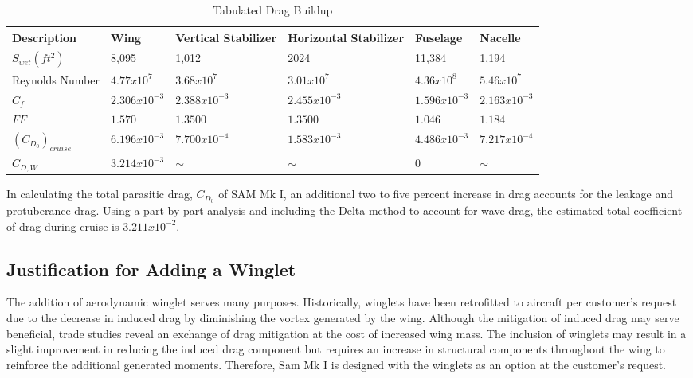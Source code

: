 \begin{table}[!h]
    \centering
    \caption{Tabulated Drag Buildup}
    \begin{tabular}{|p{0.75in}|p{0.75in}|p{0.75in}|p{0.75in}|p{0.75in}|p{0.75in}|}\toprule
        \textbf{Description} & \textbf{Wing} & \textbf{Vertical \newline Stabilizer} & \textbf{Horizontal \newline Stabilizer} & \textbf{Fuselage} & \textbf{Nacelle}  \\ \midrule \hline
        $S_{wet} (ft^2)$ & 8,095 & 1,012 & 2024 & 11,384 & 1,194 \\ \hline
        Reynolds Number & $4.77x10^7$ & $3.68x10^7$ & $3.01x10^7$ & $4.36 x 10^8$ & $5.46 x 10^7$ \\ \hline
        $C_{f}$ & $2.306 x 10^{-3}$ & $2.388 x 10^{-3}$ & $2.455 x 10^{-3}$ & $1.596 x 10^{-3}$ & $2.163 x 10^{-3}$ \\ \hline
        $FF$ & $1.570$ & $1.3500$ & $1.3500$ & $1.046$ & $1.184$ \\ \hline
        \textbf{$(C_{D_{0}})_{cruise}$} & $6.196 x 10^{-3}$ & $7.700 x 10^{-4}$ & $1.583 x 10^{-3}$ & $4.486 x 10^{-3}$ & $7.217x10^{-4}$ \\ \midrule
        \textbf{$C_{D,W}$} & $3.214 x 10^{-3}$ & $\sim$ & $\sim$ & 0 & $\sim$ \\ \hline
        
    \end{tabular}
    \label{tab:dragbuildup}
\end{table}

In calculating the total parasitic drag, $C_{D_{0}}$ of SAM Mk I, an additional two to five percent increase in drag accounts for the leakage and protuberance drag. \cite{raymer}  Using a part-by-part analysis and including the Delta method to account for wave drag, the estimated total coefficient of drag during cruise is $3.211 x 10^{-2}$.

\subsection{Justification for Adding a Winglet}
The addition of aerodynamic winglet serves many purposes.  Historically, winglets have been retrofitted to aircraft per customer's request due to the decrease in induced drag by diminishing the vortex generated by the wing\cite{winglets}.  Although the mitigation of induced drag may serve beneficial, trade studies reveal an exchange of drag mitigation at the cost of increased wing mass.  The inclusion of winglets may result in a slight improvement in reducing the induced drag component but requires an increase in structural components throughout the wing to reinforce the additional generated moments.  Therefore, Sam Mk I is designed with the winglets as an option at the customer's request.


